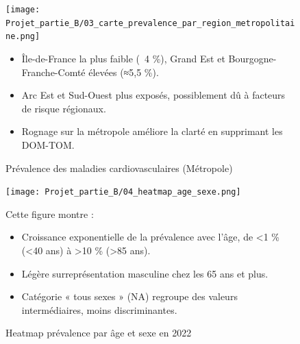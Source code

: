 \documentclass[12pt,a4paper]{article}
\begin{document}
\begin{figure}[H]
  \centering
  \begin{minipage}[t]{0.5\textwidth}
    \centering
    \texttt{[image: Projet\_partie\_B/03\_carte\_prevalence\_par\_region\_metropolitaine.png]}
    \caption{Prévalence des maladies cardiovasculaires (Métropole)}
    \label{fig:carte_prevalence}
  \end{minipage}
  \hfill
  \begin{minipage}[t]{0.48\textwidth}
    \small
    \begin{itemize}
      \item Île-de-France la plus faible (~4 \%), Grand Est et Bourgogne-Franche-Comté élevées (≈5,5 \%).  
      \item Arc Est et Sud-Ouest plus exposés, possiblement dû à facteurs de risque régionaux.  
      \item Rognage sur la métropole améliore la clarté en supprimant les DOM-TOM.  
    \end{itemize}
  \end{minipage}
\end{figure}

\begin{figure}[H]
  \centering
  \begin{minipage}[t]{0.48\textwidth}
    \centering
    \texttt{[image: Projet\_partie\_B/04\_heatmap\_age\_sexe.png]}
    \caption{Heatmap prévalence par âge et sexe en 2022}
    \label{fig:heatmap_age_sexe}
  \end{minipage}
  \hfill
  \begin{minipage}[t]{0.48\textwidth}
    \small
    Cette figure montre :
    \begin{itemize}
      \item Croissance exponentielle de la prévalence avec l’âge, de <1 \% (<40 ans) à >10 \% (>85 ans).  
      \item Légère surreprésentation masculine chez les 65 ans et plus.  
      \item Catégorie « tous sexes » (NA) regroupe des valeurs intermédiaires, moins discriminantes.  
    \end{itemize}
  \end{minipage}
\end{figure}
\end{document}

